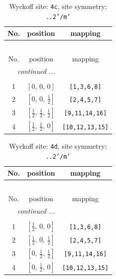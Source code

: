 \documentclass[fleqn,8pt]{jsarticle}
\begin{document}
\renewcommand{\arraystretch}{1.2}
\begin{longtable}{ccc}
\caption{Wyckoff site: {\tt 4c}, site symmetry: {\tt ..2'/m'}}
 \\
 \hline \hline
No. & position & mapping \\ \hline \endfirsthead

\multicolumn{2}{l}{\tablename\ \thetable{}} \\
 \hline \hline
No. & position & mapping \\ \hline \endhead

 \hline \hline
\multicolumn{2}{r}{\footnotesize\it continued ...} \\ \endfoot

 \hline \hline
\multicolumn{2}{r}{} \\ \endlastfoot

1 & $\left[ 0,\, 0,\, 0 \right]$ & {\tt [1,3,6,8]} \\ \hline
2 & $\left[ 0,\, 0,\, \frac{1}{2} \right]$ & {\tt [2,4,5,7]} \\ \hline
3 & $\left[ \frac{1}{2},\, \frac{1}{2},\, \frac{1}{2} \right]$ & {\tt [9,11,14,16]} \\ \hline
4 & $\left[ \frac{1}{2},\, \frac{1}{2},\, 0 \right]$ & {\tt [10,12,13,15]} \\
\end{longtable}
\renewcommand{\arraystretch}{1.2}
\begin{longtable}{ccc}
\caption{Wyckoff site: {\tt 4d}, site symmetry: {\tt ..2'/m'}}
 \\
 \hline \hline
No. & position & mapping \\ \hline \endfirsthead

\multicolumn{2}{l}{\tablename\ \thetable{}} \\
 \hline \hline
No. & position & mapping \\ \hline \endhead

 \hline \hline
\multicolumn{2}{r}{\footnotesize\it continued ...} \\ \endfoot

 \hline \hline
\multicolumn{2}{r}{} \\ \endlastfoot

1 & $\left[ \frac{1}{2},\, 0,\, 0 \right]$ & {\tt [1,3,6,8]} \\ \hline
2 & $\left[ \frac{1}{2},\, 0,\, \frac{1}{2} \right]$ & {\tt [2,4,5,7]} \\ \hline
3 & $\left[ 0,\, \frac{1}{2},\, \frac{1}{2} \right]$ & {\tt [9,11,14,16]} \\ \hline
4 & $\left[ 0,\, \frac{1}{2},\, 0 \right]$ & {\tt [10,12,13,15]} \\
\end{longtable}
\end{document}
